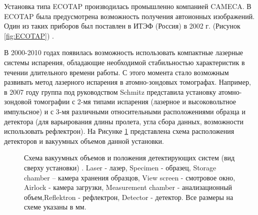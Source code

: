 Установка типа ECOTAP производилась промышленно компанией CAMECA. В ECOTAP была предусмотрена возможность получения автоионных изображений. Один из таких приборов был поставлен в ИТЭФ (Россия) в 2002 г. (Рисунок \cref{fig:ECOTAP}) \cite{Suvorov06}.

В 2000-2010 годах появилась возможность использовать компактные лазерные системы испарения, обладающие необходимой стабильностью характеристик в течении длительного времени работы. С этого момента стало возможным развивать метод лазерного  испарения в атомно-зондовых томографах. Например, в 2007 году группа под руководством Schmitz  \cite{Stender07} представила установку атомно-зондовой томографии с 2-мя типами испарения (лазерное и высоковольтное импульсное) и с 3-мя различными относительными расположениями образца и детектора (для варьирования длины пролета, угла сбора данных, возможности использовать рефлектрон). На Рисунке \cref{fig:Schmitz} представлена схема расположения детекторов и вакуумных объемов данной установки. 

\begin{figure}[htb]
	\caption{Схема вакуумных объемов и положения детектирующих систем (вид сверху установки) \cite{Stender07}.  Laser - лазер, Specimen - образец, Storage chamber – камера хранения образцов, View screen - смотровое окно, Airlock - камера загрузки, Measurement chamber - анализационный объем,Reflektron - рефлектрон, Detector - детектор. Все размеры на схеме указаны в мм.}
	\label{fig:Schmitz}
\end{figure}

